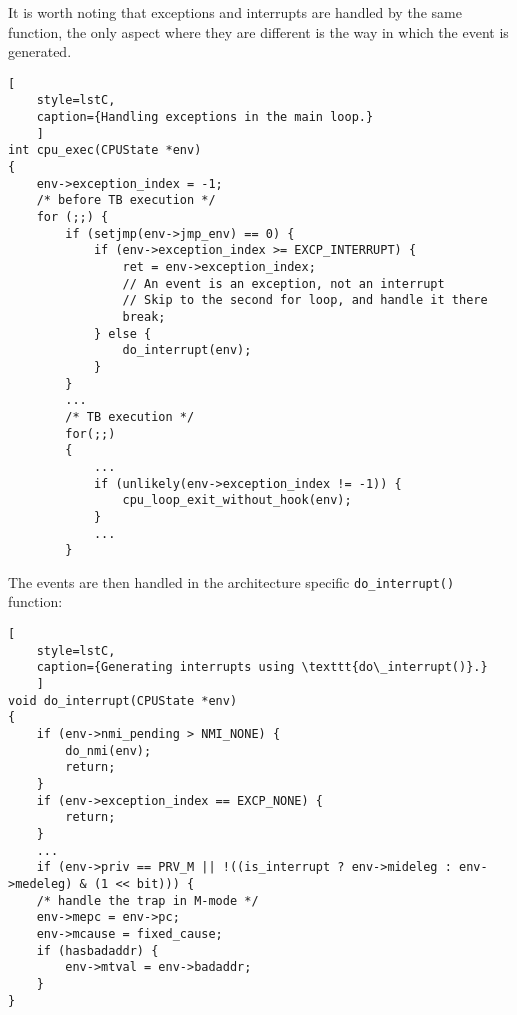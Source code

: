 It is worth noting that exceptions and interrupts are handled by the same function, the only aspect where they are
different is the way in which the event is generated.

\pagebreak

\begin{lstlisting}[
    style=lstC,
    caption={Handling exceptions in the main loop.}
    ]
int cpu_exec(CPUState *env)
{
    env->exception_index = -1;
    /* before TB execution */
    for (;;) {
        if (setjmp(env->jmp_env) == 0) {
            if (env->exception_index >= EXCP_INTERRUPT) {
                ret = env->exception_index;
                // An event is an exception, not an interrupt
                // Skip to the second for loop, and handle it there
                break;
            } else {
                do_interrupt(env);
            }
        }
        ...
        /* TB execution */
        for(;;)
        {
            ...
            if (unlikely(env->exception_index != -1)) {
                cpu_loop_exit_without_hook(env);
            }
            ...
        }
\end{lstlisting}

\noindent
The events are then handled in the architecture specific \texttt{do\_interrupt()} function:

\begin{lstlisting}[
    style=lstC,
    caption={Generating interrupts using \texttt{do\_interrupt()}.}
    ]
void do_interrupt(CPUState *env)
{
    if (env->nmi_pending > NMI_NONE) {
        do_nmi(env);
        return;
    }
    if (env->exception_index == EXCP_NONE) {
        return;
    }
    ...
    if (env->priv == PRV_M || !((is_interrupt ? env->mideleg : env->medeleg) & (1 << bit))) {
    /* handle the trap in M-mode */
    env->mepc = env->pc;
    env->mcause = fixed_cause;
    if (hasbadaddr) {
        env->mtval = env->badaddr;
    }
}
\end{lstlisting}
